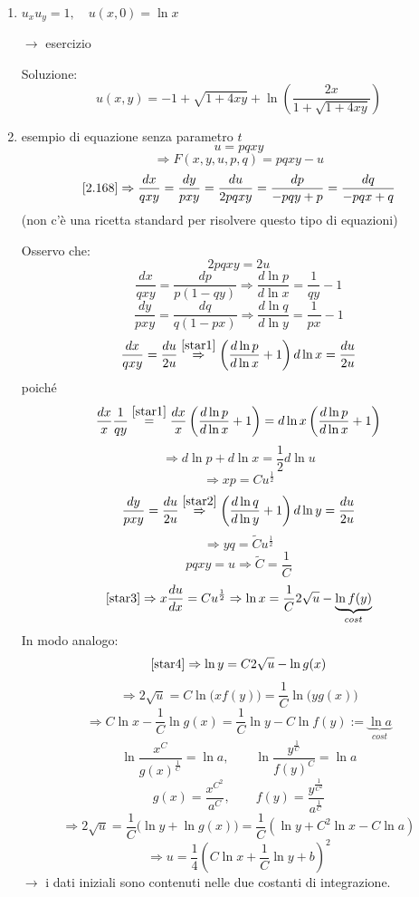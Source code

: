 \documentclass[a4paper,11pt]{report}
\begin{document}
\begin{enumerate}[label=(\roman*)]
\item $u_xu_y=1, \quad u(x,0)=\ln x$

$\rightarrow$ esercizio

Soluzione:
\[
u(x,y)=-1+\sqrt{1+4xy}+\ln \left(\frac{2x}{1+\sqrt{1+4xy}}\right)
\]

\item esempio di equazione senza parametro $t$
\[
u=pqxy
\]
\[
\Rightarrow F(x,y,u,p,q)=pqxy-u
\]
\[
\eqref{2.168}\Rightarrow \frac{dx}{qxy}=\frac{dy}{pxy} =\frac{du}{2pqxy}=\frac{dp}{-pqy+p}=\frac{dq}{-pqx+q}
\]
(non c'\`e una ricetta standard per risolvere questo tipo di equazioni)

Osservo che:
\[
2pqxy=2u
\]
\begin{equation}
\frac{dx}{qxy}=\frac{dp}{p(1-qy)}\Rightarrow \frac{d\ln p}{d\ln x}=\frac{1}{qy}-1
\label{star1}
\tag{$*$}
\end{equation}
\begin{equation}
\frac{dy}{pxy}=\frac{dq}{q(1-px)}\Rightarrow \frac{d \ln q}{d \ln y}=\frac{1}{px}-1
\label{star2}
\tag{$**$}
\end{equation}
\[
\frac{dx}{qxy}=\frac{du}{2u}\overset{\eqref{star1}}{\Rightarrow} \left(\frac{d\ln p}{d\ln x}+1\right)d\ln x = \frac{du}{2u}
\]
poich\'e
\[
\frac{dx}{x} \frac{1}{qy}\overset{\eqref{star1}}{=}\frac{dx}{x}\left(\frac{d\ln p}{d\ln x}+1\right)=d\ln x\left(\frac{d\ln p}{d\ln x}+1\right)
\]
\[
\Rightarrow d\ln p + d\ln x=\frac{1}{2}d\ln u
\]
\begin{equation}
\Rightarrow xp = Cu^{\frac{1}{2}} 
\label{star3}
\tag{$***$}
\end{equation}
\[
\frac{dy}{pxy}=\frac{du}{2u}\overset{\eqref{star2}}{\Rightarrow}\left(\frac{d\ln q}{d\ln y}+1\right)d\ln y=\frac{du}{2u}
\]
\begin{equation}
\Rightarrow yq=\tilde{C}u^{\frac{1}{2}}
\label{star4}
\tag{$***\,*$}
\end{equation}
\[
pqxy=u \Rightarrow \tilde{C}=\frac{1}{C}
\]
\[
\eqref{star3} \Rightarrow x\frac{d u}{d x}= Cu^{\frac{1}{2}} \Rightarrow \ln x=\frac{1}{C} 2 \sqrt{u}-\underbrace{\ln f(y)}_{cost}
\]
In modo analogo:
\[
\eqref{star4}\Rightarrow \ln y = C 2 \sqrt{u} - \ln g(x)
\]
\[
\Rightarrow 2\sqrt{u} = C\ln \big(xf(y)\big) = \frac{1}{C}\ln \big(yg(x)\big)
\]
\[
\Rightarrow C \ln x - \frac{1}{C}\ln g(x) = \frac{1}{C}\ln y - C\ln f(y) :=\underbrace{\ln a}_{cost}
\]
\[
\ln \frac{x^C}{g(x)^\frac{1}{C}}=\ln a, \qquad \ln \frac{y^\frac{1}{C}}{f(y)^C} = \ln a
\]
\[
g(x)=\frac{x^{C^2}}{a^C}, \qquad f(y)=\frac{y^\frac{1}{C^2}}{a^\frac{1}{C}}
\]
\[
\Rightarrow 2\sqrt{u}=\frac{1}{C} \big(\ln y + \ln g(x)\big) = \frac{1}{C}(\ln y + C^2 \ln x - C \ln a)
\]
\[
\Rightarrow u=\frac{1}{4}\left(C\ln x + \frac{1}{C}\ln y + b\right)^2
\]
$\rightarrow$ i dati iniziali sono contenuti nelle due costanti di integrazione.
\end{enumerate}
\end{document}
